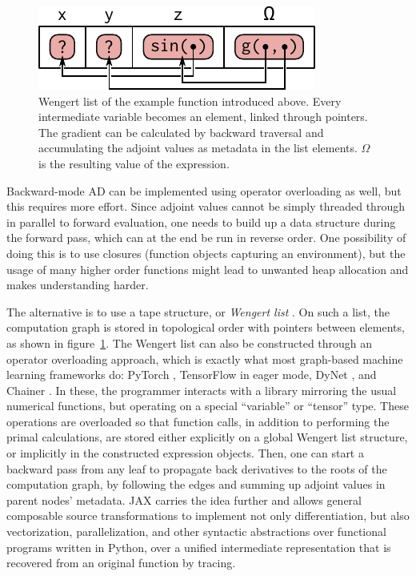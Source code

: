\begin{figure}[t]
  \centering
  \includegraphics{figures/wengert-list}
  \caption{Wengert list of the example function \protect{} introduced above.
    Every intermediate variable becomes an element, linked through pointers.  The gradient can be
    calculated by backward traversal and accumulating the adjoint values as metadata in the list
    elements.  \(\Omega\) is the resulting value of the expression.}
  \label{fig:wengert-list}
\end{figure}

Backward-mode AD can be implemented using operator overloading as well, but this requires more
effort.  Since adjoint values cannot be simply threaded through in parallel to forward evaluation,
one needs to build up a data structure during the forward pass, which can at the end be run in
reverse order.  One possibility of doing this is to use closures (function objects capturing an
environment), but the usage of many higher order functions might lead to unwanted heap allocation
and makes understanding harder.

The alternative is to use a tape structure, or \emph{Wengert list} \parencites[][section
3]{baydin2018automatic}.  On such a list, the computation graph is stored in topological order with
pointers between elements, as shown in figure~\ref{fig:wengert-list}.  The Wengert list can also be
constructed through an operator overloading approach, which is exactly what most graph-based machine
learning frameworks do: PyTorch \parencite{paszke2017automatic}, TensorFlow
\parencite{abadi2015tensorflow} in eager mode, DyNet \parencite{neubig2017dynet}, and Chainer
\parencite{tokui2015chainer}.  In these, the programmer interacts with a library mirroring the usual
numerical functions, but operating on a special \enquote{variable} or \enquote{tensor} type.  These
operations are overloaded so that function calls, in addition to performing the primal calculations,
are stored either explicitly on a global Wengert list structure, or implicitly in the constructed
expression objects.  Then, one can start a backward pass from any leaf to propagate back derivatives
to the roots of the computation graph, by following the edges and summing up adjoint values in
parent nodes' metadata.  JAX \parencite{bradbury2018jax} carries the idea further and allows general
composable source transformations to implement not only differentiation, but also vectorization,
parallelization, and other syntactic abstractions over functional programs written in Python, over a
unified intermediate representation that is recovered from an original function by tracing.

